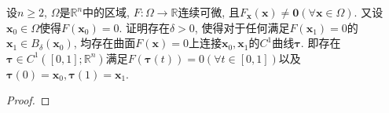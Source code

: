 \begin{quizb}
\woe 设\(n\geqslant 2\), \(\varOmega\)是\(\mathbb{R}^n\)中的区域, \(F:\varOmega\rightarrow\mathbb{R}\)连续可微, 且\(F_{\boldsymbol{x}}(\boldsymbol{x})\ne\boldsymbol{0}(\forall\boldsymbol{x}\in\varOmega)\). 又设\(\boldsymbol{x}_0\in\varOmega\)使得\(F(\boldsymbol{x}_0)=0\). 证明存在\(\delta>0\), 使得对于任何满足\(F(\boldsymbol{x}_1)=0\)的\(\boldsymbol{x}_1\in B_\delta(\boldsymbol{x}_0)\), 均存在曲面\(F(\boldsymbol{x})=0\)上连接\(\boldsymbol{x}_0,\boldsymbol{x}_1\)的\(C^1\)曲线\(\boldsymbol{\tau}\). 即存在\(\boldsymbol{\tau}\in C^1\left([0,1];\mathbb{R}^n\right)\)满足\(F\left(\boldsymbol{\tau}(t)\right)=0(\forall t\in[0,1])\)以及\(\boldsymbol{\tau}(0)=\boldsymbol{x}_0,\boldsymbol{\tau}(1)=\boldsymbol{x}_1\).
\begin{proof}
	
\end{proof}
\end{quizb}

